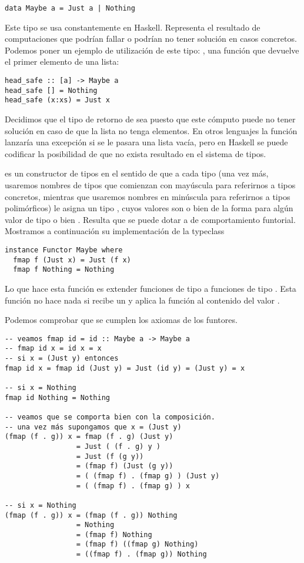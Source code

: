 \begin{verbatim}
data Maybe a = Just a | Nothing
\end{verbatim}

Este tipo se usa constantemente en Haskell. Representa el resultado
de computaciones que podrían fallar o podrían no tener solución en
casos concretos. Podemos poner un ejemplo de
utilización de este tipo: , una
función que devuelve el primer elemento de una lista:

\begin{verbatim}
head_safe :: [a] -> Maybe a
head_safe [] = Nothing
head_safe (x:xs) = Just x
\end{verbatim}

Decidimos que el tipo de retorno de  sea  puesto
que este cómputo puede no tener solución en caso de que la lista no
tenga elementos. En otros lenguajes la función  lanzaría una
excepción si se le pasara una lista vacía, pero en Haskell se puede
codificar la posibilidad de que no exista resultado
en el sistema de tipos.

 es un constructor de tipos en el sentido de que
a cada tipo  (una vez más,
usaremos nombres de tipos que comienzan con
mayúscula para referirnos a tipos concretos, mientras que usaremos
nombres en minúscula para referirnos a tipos polimórficos) le asigna
un tipo , cuyos valores son o bien de la forma
 para  algún valor de tipo  o bien
. Resulta que se puede dotar a  de
comportamiento funtorial. Mostramos a continuación su
implementación de la typeclass 
\begin{verbatim}
instance Functor Maybe where
  fmap f (Just x) = Just (f x)
  fmap f Nothing = Nothing
\end{verbatim}
Lo que hace esta función  es extender funciones de tipo
 a funciones de tipo . Esta función
no hace nada si recibe un  y aplica la función al
contenido del valor .

Podemos comprobar que se cumplen los axiomas de los funtores.

\begin{verbatim}
-- veamos fmap id = id :: Maybe a -> Maybe a
-- fmap id x = id x = x
-- si x = (Just y) entonces
fmap id x = fmap id (Just y) = Just (id y) = (Just y) = x

-- si x = Nothing
fmap id Nothing = Nothing

-- veamos que se comporta bien con la composición.
-- una vez más supongamos que x = (Just y)
(fmap (f . g)) x = fmap (f . g) (Just y)
                 = Just ( (f . g) y )
                 = Just (f (g y))
                 = (fmap f) (Just (g y))
                 = ( (fmap f) . (fmap g) ) (Just y)
                 = ( (fmap f) . (fmap g) ) x

-- si x = Nothing
(fmap (f . g)) x = (fmap (f . g)) Nothing
                 = Nothing
                 = (fmap f) Nothing
                 = (fmap f) ((fmap g) Nothing)
                 = ((fmap f) . (fmap g)) Nothing
\end{verbatim}


